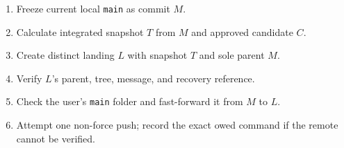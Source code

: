 \documentclass[10pt,twocolumn]{article}
\newcommand{\code}[1]{\texttt{#1}}
\begin{document}
\begin{summarybox}
\begin{enumerate}
  \item Freeze current local \code{main} as commit $M$.
  \item Calculate integrated snapshot $T$ from $M$ and approved candidate $C$.
  \item Create distinct landing $L$ with snapshot $T$ and sole parent $M$.
  \item Verify $L$'s parent, tree, message, and recovery reference.
  \item Check the user's \code{main} folder and fast-forward it from $M$ to $L$.
  \item Attempt one non-force push; record the exact owed command if the remote cannot be verified.
\end{enumerate}
\end{summarybox}
\end{document}
